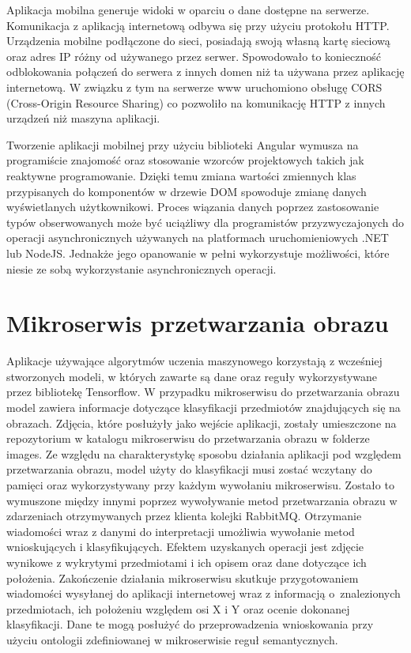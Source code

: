 {{Aplikacja mobilna generuje widoki w oparciu o dane dostępne na serwerze. Komunikacja z aplikacją internetową odbywa się przy użyciu protokołu HTTP. Urządzenia mobilne podłączone do sieci, posiadają swoją własną kartę sieciową oraz adres IP różny od używanego przez serwer. Spowodowało to konieczność odblokowania połączeń do serwera z innych domen niż ta używana przez aplikację internetową. W związku z tym na serwerze www uruchomiono obsługę CORS \cite{CORS} (Cross-Origin Resource Sharing) co pozwoliło na komunikację HTTP z innych urządzeń niż maszyna aplikacji. 

Tworzenie aplikacji mobilnej przy użyciu biblioteki Angular wymusza na programiście znajomość oraz stosowanie wzorców projektowych takich jak reaktywne programowanie. Dzięki temu zmiana wartości zmiennych klas przypisanych do komponentów w drzewie DOM spowoduje zmianę danych wyświetlanych użytkownikowi. Proces wiązania danych poprzez zastosowanie typów obserwowanych może być uciążliwy dla programistów przyzwyczajonych do operacji asynchronicznych używanych na platformach uruchomieniowych .NET lub NodeJS. Jednakże jego opanowanie w pełni wykorzystuje możliwości, które niesie ze sobą wykorzystanie asynchronicznych operacji.
}
\section{Mikroserwis przetwarzania obrazu}
{ Aplikacje używające algorytmów uczenia maszynowego korzystają z wcześniej stworzonych modeli, w których zawarte są dane oraz reguły wykorzystywane przez bibliotekę Tensorflow. W przypadku mikroserwisu do przetwarzania obrazu model zawiera informacje dotyczące klasyfikacji przedmiotów znajdujących się na obrazach. Zdjęcia, które posłużyły jako wejście aplikacji, zostały umieszczone na repozytorium w katalogu mikroserwisu do przetwarzania obrazu w folderze images. Ze względu na charakterystykę sposobu działania aplikacji pod względem przetwarzania obrazu, model użyty do klasyfikacji musi zostać wczytany do pamięci oraz wykorzystywany przy każdym wywołaniu mikroserwisu. Zostało to wymuszone między innymi poprzez wywoływanie metod przetwarzania obrazu w zdarzeniach otrzymywanych przez klienta kolejki RabbitMQ. Otrzymanie wiadomości wraz z danymi do interpretacji umożliwia wywołanie metod wnioskujących i klasyfikujących. Efektem uzyskanych operacji jest zdjęcie wynikowe z wykrytymi przedmiotami i ich opisem oraz dane dotyczące ich położenia. Zakończenie działania mikroserwisu skutkuje przygotowaniem wiadomości wysyłanej do aplikacji internetowej wraz z informacją o~znalezionych przedmiotach, ich położeniu względem osi X i Y oraz ocenie dokonanej klasyfikacji. Dane te mogą posłużyć do przeprowadzenia wnioskowania przy użyciu ontologii zdefiniowanej w mikroserwisie reguł semantycznych.
}

}
